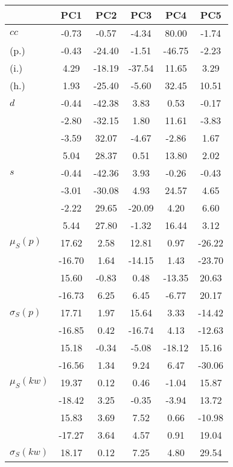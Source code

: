 \begin{table}[h!]
\begin{center}
\begin{tabular}{| l | c | c | c | c | c |}\hline
 & PC1 & PC2 & PC3 & PC4 & PC5 \\\hline
$cc$ & -0.73  & -0.57  & -4.34  & 80.00  & -1.74 \\\hline
(p.) & -0.43  & -24.40  & -1.51  & -46.75  & -2.23 \\\hline
(i.) & 4.29  & -18.19  & -37.54  & 11.65  & 3.29 \\\hline
(h.) & 1.93  & -25.40  & -5.60  & 32.45  & 10.51 \\\hline
$d$ & -0.44  & -42.38  & 3.83  & 0.53  & -0.17 \\\hline
 & -2.80  & -32.15  & 1.80  & 11.61  & -3.83 \\\hline
 & -3.59  & 32.07  & -4.67  & -2.86  & 1.67 \\\hline
 & 5.04  & 28.37  & 0.51  & 13.80  & 2.02 \\\hline
$s$ & -0.44  & -42.36  & 3.93  & -0.26  & -0.43 \\\hline
 & -3.01  & -30.08  & 4.93  & 24.57  & 4.65 \\\hline
 & -2.22  & 29.65  & -20.09  & 4.20  & 6.60 \\\hline
 & 5.44  & 27.80  & -1.32  & 16.44  & 3.12 \\\hline
$\mu_S(p)$ & 17.62  & 2.58  & 12.81  & 0.97  & -26.22 \\\hline
 & -16.70  & 1.64  & -14.15  & 1.43  & -23.70 \\\hline
 & 15.60  & -0.83  & 0.48  & -13.35  & 20.63 \\\hline
 & -16.73  & 6.25  & 6.45  & -6.77  & 20.17 \\\hline
$\sigma_S(p)$ & 17.71  & 1.97  & 15.64  & 3.33  & -14.42 \\\hline
 & -16.85  & 0.42  & -16.74  & 4.13  & -12.63 \\\hline
 & 15.18  & -0.34  & -5.08  & -18.12  & 15.16 \\\hline
 & -16.56  & 1.34  & 9.24  & 6.47  & -30.06 \\\hline
$\mu_S(kw)$ & 19.37  & 0.12  & 0.46  & -1.04  & 15.87 \\\hline
 & -18.42  & 3.25  & -0.35  & -3.94  & 13.72 \\\hline
 & 15.83  & 3.69  & 7.52  & 0.66  & -10.98 \\\hline
 & -17.27  & 3.64  & 4.57  & 0.91  & 19.04 \\\hline
$\sigma_S(kw)$ & 18.17  & 0.12  & 7.25  & 4.80  & 29.54 \\\hline

\end{tabular}
\end{center}
\end{table}

